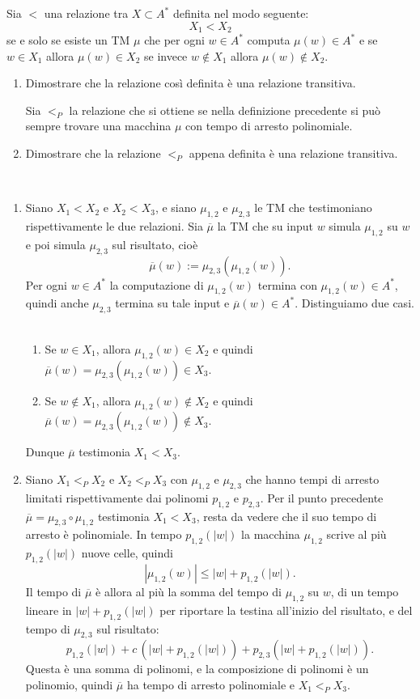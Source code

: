 \newpage

\begin{ex}
Sia $<$ una relazione tra $X\subset A^*$ definita nel modo seguente:
\[
X_1<X_2
\]
se e solo se esiste un TM $\mu$ che per ogni $w\in A^*$ computa $\mu(w)\in A^*$ e se $w\in X_1$ allora $\mu(w)\in X_2$ se invece $w\notin X_1$ allora $\mu(w)\notin X_2$.
\ 
\begin{enumerate}
\item Dimostrare che la relazione così definita è una relazione transitiva.

Sia $<_P$ la relazione che si ottiene se nella definizione precedente si può sempre trovare una macchina $\mu$ con tempo di arresto polinomiale.
\item Dimostrare che la relazione $<_P$ appena definita è una relazione transitiva.
\end{enumerate}
\end{ex}


\begin{sol}
\ 
\begin{enumerate}
\item Siano $X_1<X_2$ e $X_2<X_3$, e siano $\mu_{1,2}$ e $\mu_{2,3}$ le TM che testimoniano rispettivamente le due relazioni. Sia $\overline{\mu}$ la TM che su input $w$ simula $\mu_{1,2}$ su $w$ e poi simula $\mu_{2,3}$ sul risultato, cioè
\[
\overline{\mu}(w):=\mu_{2,3}(\mu_{1,2}(w)).
\]
Per ogni $w\in A^*$ la computazione di $\mu_{1,2}(w)$ termina con $\mu_{1,2}(w)\in A^*$, quindi anche $\mu_{2,3}$ termina su tale input e $\overline{\mu}(w)\in A^*$. Distinguiamo due casi.
\ 
\begin{enumerate}
\item Se $w\in X_1$, allora $\mu_{1,2}(w)\in X_2$ e quindi $\overline{\mu}(w)=\mu_{2,3}(\mu_{1,2}(w))\in X_3$.
\item Se $w\notin X_1$, allora $\mu_{1,2}(w)\notin X_2$ e quindi $\overline{\mu}(w)=\mu_{2,3}(\mu_{1,2}(w))\notin X_3$.
\end{enumerate}
Dunque $\overline{\mu}$ testimonia $X_1<X_3$.

\item Siano $X_1<_PX_2$ e $X_2<_PX_3$ con $\mu_{1,2}$ e $\mu_{2,3}$ che hanno tempi di arresto limitati rispettivamente dai polinomi $p_{1,2}$ e $p_{2,3}$. Per il punto precedente $\overline{\mu}=\mu_{2,3}\circ\mu_{1,2}$ testimonia $X_1<X_3$, resta da vedere che il suo tempo di arresto è polinomiale. In tempo $p_{1,2}(|w|)$ la macchina $\mu_{1,2}$ scrive al più $p_{1,2}(|w|)$ nuove celle, quindi
\[
|\mu_{1,2}(w)|\leq |w|+p_{1,2}(|w|).
\]
Il tempo di $\overline{\mu}$ è allora al più la somma del tempo di $\mu_{1,2}$ su $w$, di un tempo lineare in $|w|+p_{1,2}(|w|)$ per riportare la testina all'inizio del risultato, e del tempo di $\mu_{2,3}$ sul risultato:
\[
p_{1,2}(|w|)+c\,(|w|+p_{1,2}(|w|))+p_{2,3}(|w|+p_{1,2}(|w|)).
\]
Questa è una somma di polinomi, e la composizione di polinomi è un polinomio, quindi $\overline{\mu}$ ha tempo di arresto polinomiale e $X_1<_PX_3$.
\end{enumerate}
\end{sol}
\newpage